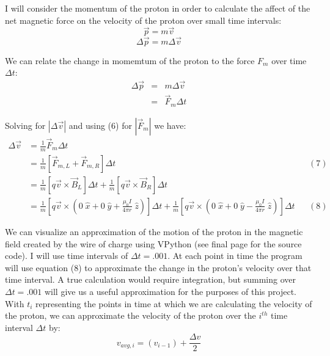 \documentclass[11pt]{article}
\begin{document}
\newpage

\noindent I will consider the momentum of the proton in order to calculate the affect of the net magnetic force on the velocity of the proton over small time intervals:
\[
\vec{p}=m\vec{v}
\] 
\[
\Delta\vec{p}=m\Delta\vec{v}
\]

\vspace{.2in}

\noindent We can relate the change in momemtum of the proton to the force $F_m$ over time $\Delta t$:
\begin{eqnarray*}
\Delta\vec{p}&=&m\Delta\vec{v}\\&=&\vec{F}_m\Delta t
\end{eqnarray*}

\vspace{.2in}

\noindent Solving for $\left|\Delta\vec{v}\right|$ and using (6) for $\left|\vec{F}_m\right|$ we have:
\begin{align*}
\Delta\vec{v}&=\frac{1}{m}\vec{F}_m\Delta t\\&=\frac{1}{m}\left[\vec{F}_{m,L}+\vec{F}_{m,R}\right]\Delta t&&(7)\\&=\frac{1}{m}\left[q\vec{v}\times\vec{B}_L\right]\Delta t + \frac{1}{m}\left[q\vec{v}\times\vec{B}_R\right]\Delta t\\&=\frac{1}{m}\left[q\vec{v}\times\left(0\;\hat{x}+0\;\hat{y}+\frac{\mu_0I}{4\pi r}\;\hat{z}\right)\right]\Delta t + \frac{1}{m}\left[q\vec{v}\times\left(0\;\hat{x}+0\;\hat{y}-\frac{\mu_0I}{4\pi r}\;\hat{z}\right)\right]\Delta t&&(8)
\end{align*} 

\vspace{.2in}

\noindent We can visualize an approximation of the motion of the proton in the magnetic field created by the wire of charge using VPython (see final page for the source code). I will use time intervals of $\Delta t=.001$. At each point in time the program will use equation (8) to approximate the change in the proton's velocity over that time interval. A true calculation would require integration, but summing over $\Delta t=.001$ will give us a useful approximation for the purposes of this project. With $t_i$ representing the points in time at which we are calculating the velocity of the proton, we can approximate the velocity of the proton over the $i^{th}$ time interval $\Delta t$ by:
\[
v_{avg,i}=\left(v_{i-1}\right)+\frac{\Delta v}{2}
\]

\vspace{.2in}
\end{document}
